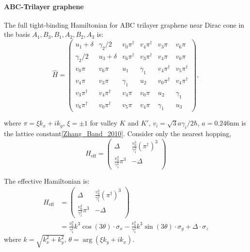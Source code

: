 \documentclass[12pt,a4paper]{article}
\begin{document}
\paragraph{ABC-Trilayer graphene}

    The full tight-binding Hamiltonian for ABC trilayer graphene near Dirac cone in the basis $A_1, B_3, B_1, A_2, B_2, A_3$ is:
    \[
    \hat{H} =
    \begin{pmatrix}
    u_1 + \delta & \gamma_2/2 & v_0\pi^\dagger & v_4\pi^\dagger & v_3\pi & v_6\pi \\
    \gamma_2/2  & u_3 + \delta & v_6\pi^\dagger & v_3\pi^\dagger & v_4\pi & v_0\pi \\
    v_0\pi      & v_6\pi        & u_1           & \gamma_1  & v_4\pi^\dagger & v_5\pi^\dagger  \\
    v_4\pi      & v_3\pi        & \gamma_1      & u_2       & v_0\pi^\dagger & v_4\pi^\dagger \\
    v_3\pi^\dagger & v_4\pi^\dagger & v_4\pi & v_0\pi & u_2         & \gamma_1  \\
    v_6\pi^\dagger & v_0\pi^\dagger & v_5\pi & v_4\pi & \gamma_1 & u_3
    \end{pmatrix},
    \]

    where $\pi = \xi k_x + ik_y$, $\xi = \pm 1$ for valley $K$ and $K'$, $v_i = \sqrt{3} a \gamma_i/ 2\hbar$, $a = 0.246\mathrm{nm}$ is the lattice constant\ref{Zhang_Band_2010}.
    Consider only the nearest hopping,
    \begin{equation}
    \label{eq:HABC}
        H_{\mathrm{eff}} = \begin{pmatrix}
            \Delta & \frac{v_0^3}{\gamma_1^2} \left(\pi^\dagger\right)^3 \\
            \frac{v_0^3}{\gamma_1^2} \pi^3 & -\Delta
        \end{pmatrix}
    \end{equation}

    The effective Hamiltonian is:
    \begin{align*}
        H_{\text{eff}}
        & = \begin{pmatrix}
            \Delta & \frac{v_0^3}{\gamma_1^2} (\pi^\dagger)^3 \\
            \frac{v_0^3}{\gamma_1^2} \pi^3 & -\Delta
        \end{pmatrix} \\
        & = \frac{v_0^3}{\gamma_1^2} k^3\cos(3\theta) \cdot \sigma_x
        - \frac{v_0^3}{\gamma_1^2} k^3\sin(3\theta) \cdot \sigma_y
        + \Delta \cdot \sigma_z
    \end{align*}
    where $k = \sqrt{k_x^2 + k_y^2}$, $\theta = \arg(\xi k_y + ik_x)$.
\end{document}
